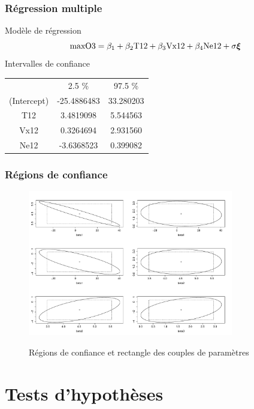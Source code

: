 \begin{frame}
\frametitle{Régression multiple}
\alert{Modèle de régression}
\[
\mathrm{maxO3}= \beta_1 + \beta_2 \mathrm{T12} + \beta_3 \mathrm{Vx12} + \beta_4 \mathrm{Ne12} + \sigma \boldsymbol{\xi}
\]
\alert{Intervalles de confiance}
\begin{table}
\begin{tabular}{ccc}
            &      2.5 \% &   97.5 \% \\
(Intercept) &-25.4886483  & 33.280203 \\
T12         &  3.4819098  & 5.544563  \\
Vx12        &  0.3264694  & 2.931560  \\
Ne12        & -3.6368523  & 0.399082
\end{tabular}
\end{table}
\end{frame}

\begin{frame}
\frametitle{Régions de confiance}
\begin{figure}
  \centering
  \includegraphics[width=0.8\textwidth]{Rconfiance}\\
  \caption{Régions de confiance et rectangle des couples de paramètres}
\end{figure}
\end{frame}

\section{Tests d'hypothèses}

